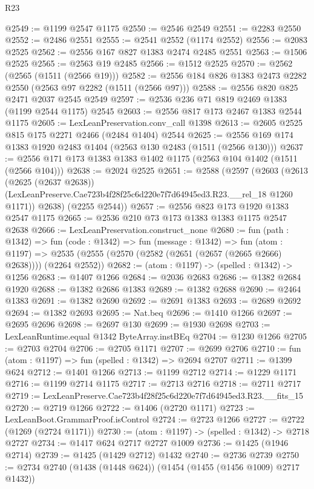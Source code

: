 \begin{lexlean}{R23}
\begin{coremodule}
@2549 := @1199 @2547 @1175
@2550 := @2546 @2549
@2551 := @2283 @2550
@2552 := @2486 @2551
@2555 := @2541 @2552 (@1174 @2552)
@2556 := @2083 @2525
@2562 := @2556 @167 @827 @1383 @2474 @2485 @2551
@2563 := @1506 @2525
@2565 := @2563 @19 @2485
@2566 := @1512 @2525
@2570 := @2562 (@2565 (@1511 (@2566 @19)))
@2582 := @2556 @184 @826 @1383 @2473 @2282 @2550 (@2563 @97 @2282 (@1511 (@2566 @97)))
@2588 := @2556 @820 @825 @2471 @2037 @2545 @2549
@2597 := @2536 @236 @71 @819 @2469 @1383 (@1199 @2544 @1175) @2545
@2603 := @2556 @817 @173 @2467 @1383 @2544 @1175
@2605 := LexLeanPreservation.conv_call @1398
@2613 := @2605 @2525 @815 @175 @2271 @2466 (@2484 @1404) @2544
@2625 := @2556 @169 @174 @1383 @1920 @2483 @1404 (@2563 @130 @2483 (@1511 (@2566 @130)))
@2637 := @2556 @171 @173 @1383 @1383 @1402 @1175 (@2563 @104 @1402 (@1511 (@2566 @104)))
@2638 := @2024 @2525
@2651 := @2588
    (@2597
      (@2603
        (@2613
          (@2625 (@2637 @2638))
          (LexLeanPreserve.Cae723b4f28f25c6d220e7f7d64945ed3.R23.__rel_18 @1260 @1171))
        @2638)
      (@2255 @2544))
@2657 := @2556 @823 @173 @1920 @1383 @2547 @1175
@2665 := @2536 @210 @73 @173 @1383 @1383 @1175 @2547 @2638
@2666 := LexLeanPreservation.construct_none
@2680 := fun (path : @1342) =>
  fun (code : @1342) =>
  fun (message : @1342) =>
  fun (atom : @1197) =>
  @2535 (@2555 (@2570 (@2582 (@2651 (@2657 (@2665 @2666) @2638)))) (@2264 @2552))
@2682 := (atom : @1197) -> (spelled : @1342) -> @1256
@2683 := @1407 @1266
@2684 := @2036 @2683
@2686 := @1382 @2684 @1920
@2688 := @1382 @2686 @1383
@2689 := @1382 @2688
@2690 := @2464 @1383
@2691 := @1382 @2690
@2692 := @2691 @1383
@2693 := @2689 @2692
@2694 := @1382 @2693
@2695 := Nat.beq
@2696 := @1410 @1266
@2697 := @2695 @2696
@2698 := @2697 @130
@2699 := @1930 @2698
@2703 := LexLeanRuntime.equal @1342 ByteArray.instBEq
@2704 := @1230 @1266
@2705 := @2703 @2704
@2706 := @2705 @1171
@2707 := @2699 @2706
@2710 := fun (atom : @1197) => fun (spelled : @1342) => @2694 @2707
@2711 := @1399 @624
@2712 := @1401 @1266
@2713 := @1199 @2712
@2714 := @1229 @1171
@2716 := @1199 @2714 @1175
@2717 := @2713 @2716
@2718 := @2711 @2717
@2719 := LexLeanPreserve.Cae723b4f28f25c6d220e7f7d64945ed3.R23.__fits_15
@2720 := @2719 @1266
@2722 := @1406 (@2720 @1171)
@2723 := LexLeanBoot.GrammarProof.isControl
@2724 := @2723 @1266
@2727 := @2722 (@1269 (@2724 @1171))
@2730 := (atom : @1197) -> (spelled : @1342) -> @2718 @2727
@2734 := @1417 @624 @2717 @2727 @1009
@2736 := @1425 (@1946 @2714)
@2739 := @1425 (@1429 @2712) @1432
@2740 := @2736 @2739
@2750 := @2734 @2740 (@1438 (@1448 @624)) (@1454 (@1455 (@1456 @1009) @2717 @1432))

\end{coremodule}
\end{lexlean}
